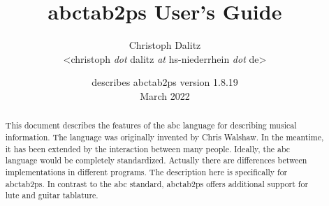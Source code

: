 \documentclass[a4paper]{article}
\begin{document}
\title{\vspace*{-8mm}
abctab2ps User's Guide}
\author{
Christoph Dalitz
\\\textless christoph {\it dot} dalitz {\it at} hs-niederrhein {\it dot} de\textgreater
}
\date{describes abctab2ps version 1.8.19\\[1.0ex]
March 2022}
\maketitle


\begin{abstract}
\noindent
This document describes the features of the abc language for describing
musical information. The language was originally invented by Chris Walshaw.
In the meantime, it has been extended by the interaction between
many people. Ideally, the abc language would be completely standardized.
Actually there are differences between implementations in different programs.
The description here is specifically for abctab2ps. In contrast to the
abc standard, abctab2ps offers additional support for lute and guitar
tablature.
\end{abstract}


\tableofcontents

\end{document}
